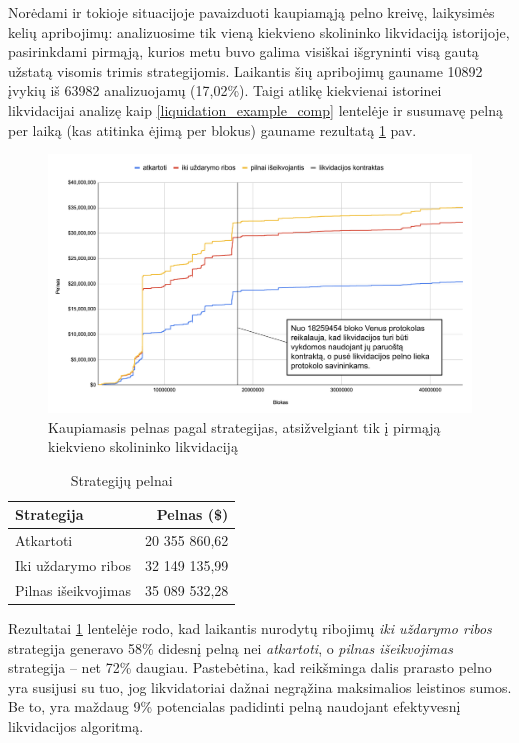\documentclass[]{VUMIFTemplateClass}
\begin{document}
Norėdami ir tokioje situacijoje pavaizduoti kaupiamąją pelno kreivę, laikysimės kelių apribojimų: analizuosime tik vieną kiekvieno skolininko likvidaciją istorijoje, pasirinkdami pirmąją, kurios metu buvo galima visiškai išgryninti visą gautą užstatą visomis trimis strategijomis. Laikantis šių apribojimų gauname 10892 įvykių iš 63982 analizuojamų (17,02\%). Taigi atlikę kiekvienai istorinei likvidacijai analizę kaip \ref{liquidation_example_comp} lentelėje ir susumavę pelną per laiką (kas atitinka ėjimą per blokus) gauname rezultatą \ref{img:bendras2} pav.

\begin{figure}[H]
  \centering
  \includegraphics[scale=0.4]{img/bendras4.png}
  \caption{Kaupiamasis pelnas pagal strategijas, atsižvelgiant tik į pirmąją kiekvieno skolininko likvidaciją}
  \label{img:bendras2}
\end{figure}

\begin{table}[h!]
  \centering
  \caption{Strategijų pelnai}
  \label{tab:strategiju_pelnai}
  \begin{tabular}{|l|r|}
  \hline
  \textbf{Strategija}                     & \textbf{Pelnas (\$)} \\ \hline
  Atkartoti                               & 20 355 860,62        \\ \hline
  Iki uždarymo ribos              & 32 149 135,99        \\ \hline
  Pilnas išeikvojimas                           & 35 089 532,28        \\ \hline
  \end{tabular}
  \end{table}

Rezultatai \ref{tab:strategiju_pelnai} lentelėje rodo, kad laikantis nurodytų ribojimų \textit{iki uždarymo ribos} strategija generavo 58\% didesnį pelną nei \textit{atkartoti}, o \textit{pilnas išeikvojimas} strategija – net 72\% daugiau. Pastebėtina, kad reikšminga dalis prarasto pelno yra susijusi su tuo, jog likvidatoriai dažnai negrąžina maksimalios leistinos sumos. Be to, yra maždaug 9\% potencialas padidinti pelną naudojant efektyvesnį likvidacijos algoritmą.
\end{document}
